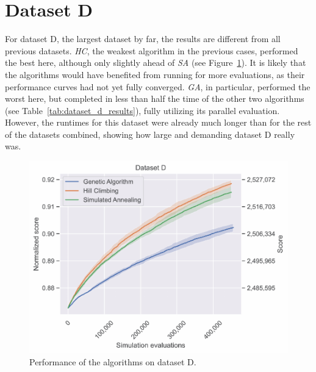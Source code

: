 \newpage
\section{Dataset D} \label{sec:dataset_d}

For dataset D, the largest dataset by far, the results are different from all previous datasets. \textit{HC}, the weakest algorithm in the previous cases, performed the best here, although only slightly ahead of \textit{SA} (see Figure~\ref{fig:dataset_d_experiment}). It is likely that the algorithms would have benefited from running for more evaluations, as their performance curves had not yet fully converged.
\textit{GA}, in particular, performed the worst here, but completed in less than half the time of the other two algorithms (see Table~\ref{tab:dataset_d_results}), fully utilizing its parallel evaluation.
However, the runtimes for this dataset were already much longer than for the rest of the datasets combined, showing how large and demanding dataset D really was.

\bigskip

\begin{figure}[h]
    \centering
    \includegraphics[width=\linewidth]{img/experiments/pdfa-d_Genetic Algorithm_Hill Climbing_Simulated Annealing.pdf}
    \caption[Performance of the algorithms on dataset D]{
        Performance of the algorithms on dataset D.
    }
    \label{fig:dataset_d_experiment}
\end{figure}


